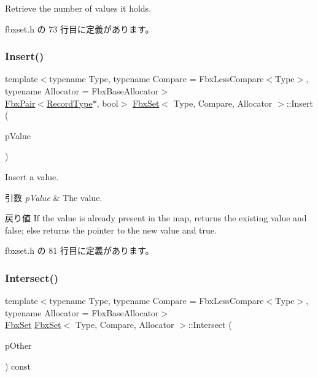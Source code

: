 Retrieve the number of values it holds. 



 fbxset.\+h の 73 行目に定義があります。

\mbox{\label{class_fbx_set_a6663843db5bbd2335842fc77c02f7197}} 
\subsubsection{\texorpdfstring{Insert()}{Insert()}}
{\footnotesize\ttfamily template$<$typename Type, typename Compare = Fbx\+Less\+Compare$<$\+Type$>$, typename Allocator = Fbx\+Base\+Allocator$>$ \\
\hyperlink{class_fbx_pair}{Fbx\+Pair}$<$\hyperlink{class_fbx_set_aa3934cd434a09288204f5e6c99b9cd01}{Record\+Type}$\ast$, bool$>$ \hyperlink{class_fbx_set}{Fbx\+Set}$<$ Type, Compare, Allocator $>$\+::Insert (\begin{DoxyParamCaption}\item[{const \hyperlink{class_fbx_set_abb0f1b628634e07825532526e2e92baf}{Value\+Type} \&}]{p\+Value }\end{DoxyParamCaption})\hspace{0.3cm}{\ttfamily [inline]}}

Insert a value. 
\begin{DoxyParams}{引数}
{\em p\+Value} & The value. \\
\hline
\end{DoxyParams}
\begin{DoxyReturn}{戻り値}
If the value is already present in the map, returns the existing value and false; else returns the pointer to the new value and true. 
\end{DoxyReturn}


 fbxset.\+h の 81 行目に定義があります。

\mbox{\label{class_fbx_set_abea1a48c480a2f3ac236f8ff198fc2ce}} 
\subsubsection{\texorpdfstring{Intersect()}{Intersect()}}
{\footnotesize\ttfamily template$<$typename Type, typename Compare = Fbx\+Less\+Compare$<$\+Type$>$, typename Allocator = Fbx\+Base\+Allocator$>$ \\
\hyperlink{class_fbx_set}{Fbx\+Set} \hyperlink{class_fbx_set}{Fbx\+Set}$<$ Type, Compare, Allocator $>$\+::Intersect (\begin{DoxyParamCaption}\item[{const \hyperlink{class_fbx_set}{Fbx\+Set}$<$ Type, Compare, Allocator $>$ \&}]{p\+Other }\end{DoxyParamCaption}) const\hspace{0.3cm}{\ttfamily [inline]}}

